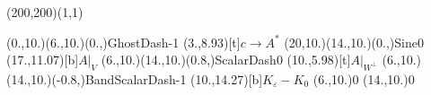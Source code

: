 \unitlength=1bp%

\begin{feynartspicture}(200,200)(1,1)

\FADiagram{}
\FAProp(0.,10.)(6.,10.)(0.,){GhostDash}{-1}
\FALabel(3.,8.93)[t]{$c\to A^*$}
\FAProp(20,10.)(14.,10.)(0.,){Sine}{0}
\FALabel(17.,11.07)[b]{$A|_V$}
\FAProp(6.,10.)(14.,10.)(0.8,){ScalarDash}{0}
\FALabel(10.,5.98)[t]{$A|_{W^\perp}$}
\FAProp(6.,10.)(14.,10.)(-0.8,){BandScalarDash}{-1}
\FALabel(10.,14.27)[b]{$K_\varepsilon-K_0$}
\FAVert(6.,10.){0}
\FAVert(14.,10.){0}
\end{feynartspicture}

